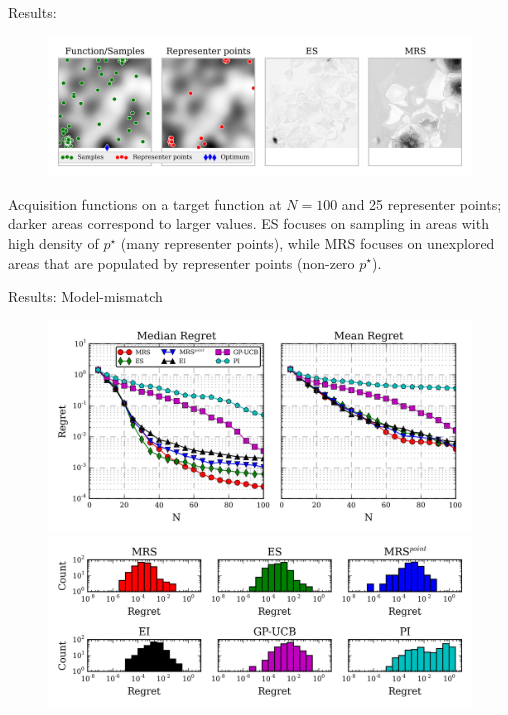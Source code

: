 \documentclass[11pt]{beamer}
\begin{document}
\begin{frame}{Results: }
\begin{figure}
\centering
\includegraphics[width=.8\textwidth]{../pics/es_analysis}
\label{fig:es_analysis}
\end{figure}

Acquisition functions on a target function at $N=100$ and 25 representer points; darker areas correspond to larger values. ES focuses on sampling in areas with high density of $p^\star$ (many representer points), while MRS focuses on unexplored areas that are populated by representer points (non-zero $p^\star$).

\end{frame}


\begin{frame}{Results: Model-mismatch}
\begin{figure}
\centering
\includegraphics[width=.7\textwidth]{../pics/empirical_comparison_mm} \\
\includegraphics[width=.7\textwidth]{../pics/hist_mm}
\end{figure}
\end{frame}
\end{document}
